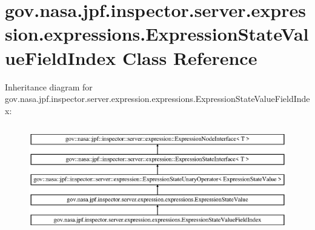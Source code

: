 \hypertarget{classgov_1_1nasa_1_1jpf_1_1inspector_1_1server_1_1expression_1_1expressions_1_1_expression_state_value_field_index}{}\section{gov.\+nasa.\+jpf.\+inspector.\+server.\+expression.\+expressions.\+Expression\+State\+Value\+Field\+Index Class Reference}
\label{classgov_1_1nasa_1_1jpf_1_1inspector_1_1server_1_1expression_1_1expressions_1_1_expression_state_value_field_index}
Inheritance diagram for gov.\+nasa.\+jpf.\+inspector.\+server.\+expression.\+expressions.\+Expression\+State\+Value\+Field\+Index\+:\begin{figure}[H]
\begin{center}
\leavevmode
\includegraphics[height=4.745763cm]{classgov_1_1nasa_1_1jpf_1_1inspector_1_1server_1_1expression_1_1expressions_1_1_expression_state_value_field_index}
\end{center}
\end{figure}
